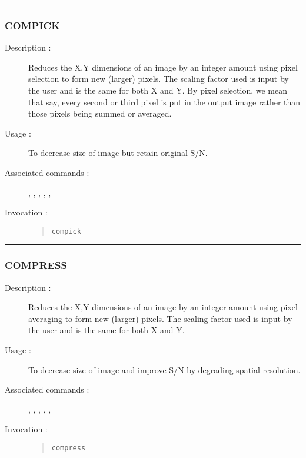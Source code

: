 \hrule 
\subsubsection*{\label{COMPICK}COMPICK}

\begin{description}

\item[Description :] Reduces the X,Y dimensions of an image by an
integer amount using pixel selection to form new (larger) pixels.  The
scaling factor used is input by the user and is the same for both X and
Y.  By pixel selection, we mean that say, every second or third pixel
is put in the output image rather than those pixels being summed or
averaged.

\item[Usage :] To decrease size of image but retain original S/N.

\item[Associated commands :] {\tt {}}, 
{\tt {}}, {\tt {}}, 
{\tt {}}, {\tt {}}, 
{\tt {}}

\item[Invocation :]

\begin{quote}{\tt  compick }\end{quote}

\end{description}

\hrule 
\subsubsection*{\label{COMPRESS}COMPRESS}

\begin{description}

\item[Description :] Reduces the X,Y dimensions of an image by an
integer amount using pixel averaging to form new (larger) pixels.  The
scaling factor used is input by the user and is the same for both X and
Y.

\item[Usage :] To decrease size of image and improve S/N by degrading
spatial resolution.

\item[Associated commands :] {\tt {}}, 
{\tt {}}, {\tt {}}, 
{\tt {}}, {\tt {}}, 
{\tt {}}

\item[Invocation :]

\begin{quote}{\tt  compress }\end{quote}

\end{description}

